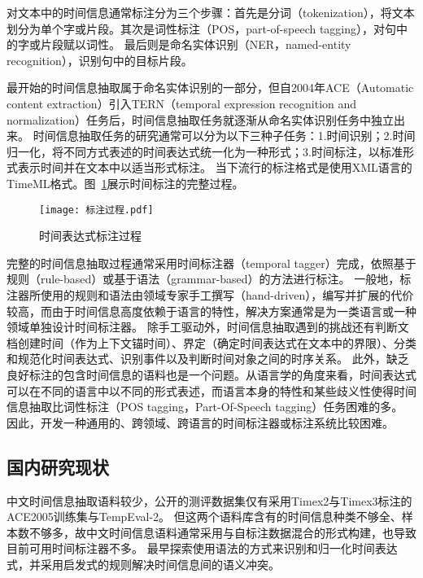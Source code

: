 对文本中的时间信息通常标注分为三个步骤：首先是分词（tokenization），将文本划分为单个字或片段。其次是词性标注（POS，part-of-speech tagging），对句中的字或片段赋以词性。
最后则是命名实体识别（NER，named-entity recognition），识别句中的目标片段。

最开始的时间信息抽取属于命名实体识别的一部分，但自2004年ACE\cite{doddington2004automatic}（Automatic content extraction）引入TERN（temporal expression recognition and normalization）任务后，时间信息抽取任务就逐渐从命名实体识别任务中独立出来。
时间信息抽取任务的研究通常可以分为以下三种子任务：1.时间识别；2.时间归一化，将不同方式表述的时间表达式统一化为一种形式；3.时间标注，以标准形式表示时间并在文本中以适当形式标注。
当下流行的标注格式是使用XML语言的TimeML\cite{pustejovsky2003timeml}格式。图~\ref{fig:tagging_pregress}展示时间标注的完整过程。

\begin{figure}[h]
    \centering
    \texttt{[image: 标注过程.pdf]}
    \caption{时间表达式标注过程}
    \label{fig:tagging_pregress}
\end{figure}

完整的时间信息抽取过程通常采用时间标注器（temporal tagger）完成，依照基于规则（rule-based）或基于语法（grammar-based）的方法进行标注。
一般地，标注器所使用的规则和语法由领域专家手工撰写（hand-driven），编写并扩展的代价较高，而由于时间信息高度依赖于语言的特性，解决方案通常是为一类语言或一种领域单独设计时间标注器。
除手工驱动外，时间信息抽取遇到的挑战还有判断文档创建时间（作为上下文锚时间）、界定（确定时间表达式在文本中的界限）、分类和规范化时间表达式、识别事件以及判断时间对象之间的时序关系。
此外，缺乏良好标注的包含时间信息的语料也是一个问题。从语言学的角度来看，时间表达式可以在不同的语言中以不同的形式表述，而语言本身的特性和某些歧义性使得时间信息抽取比词性标注（POS tagging，Part-Of-Speech tagging）任务困难的多。
因此，开发一种通用的、跨领域、跨语言的时间标注器或标注系统比较困难。


\subsection{国内研究现状}

中文时间信息抽取语料较少，公开的测评数据集仅有采用Timex2与Timex3标注的ACE2005训练集与TempEval-2。
但这两个语料库含有的时间信息种类不够全、样本数不够多，故中文时间信息语料通常采用与自标注数据混合的形式构建，也导致目前可用时间标注器不多。
\citet{mingli2005ctemp}最早探索使用语法的方式来识别和归一化时间表达式，并采用启发式的规则解决时间信息间的语义冲突。

